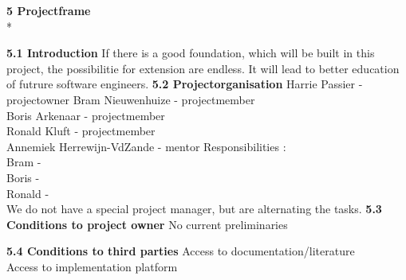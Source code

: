 \documentclass{article}
\begin{document}
\textbf{5 Projectframe}
\\*
\newline

\noindent
\textbf{5.1 Introduction}
\newline
If there is a good foundation, which will be built in this project, the possibilitie for extension are endless. It will lead to better education of futrure software engineers.  
\noindent
\textbf{5.2 Projectorganisation}
\newline
Harrie Passier - projectowner
Bram Nieuwenhuize - projectmember\\
Boris Arkenaar - projectmember\\
Ronald Kluft - projectmember\\
Annemiek Herrewijn-VdZande - mentor
\newline
Responsibilities :\\
Bram - \\
Boris - \\
Ronald - \\
We do not have a special project manager, but are alternating the tasks.
\noindent
\textbf{5.3 Conditions to project owner}
\newline
No current preliminaries
\newline

\noindent
\textbf{5.4 Conditions to third parties}
\newline
Access to documentation/literature\\
Access to implementation platform\\
\newline
\end{document}
